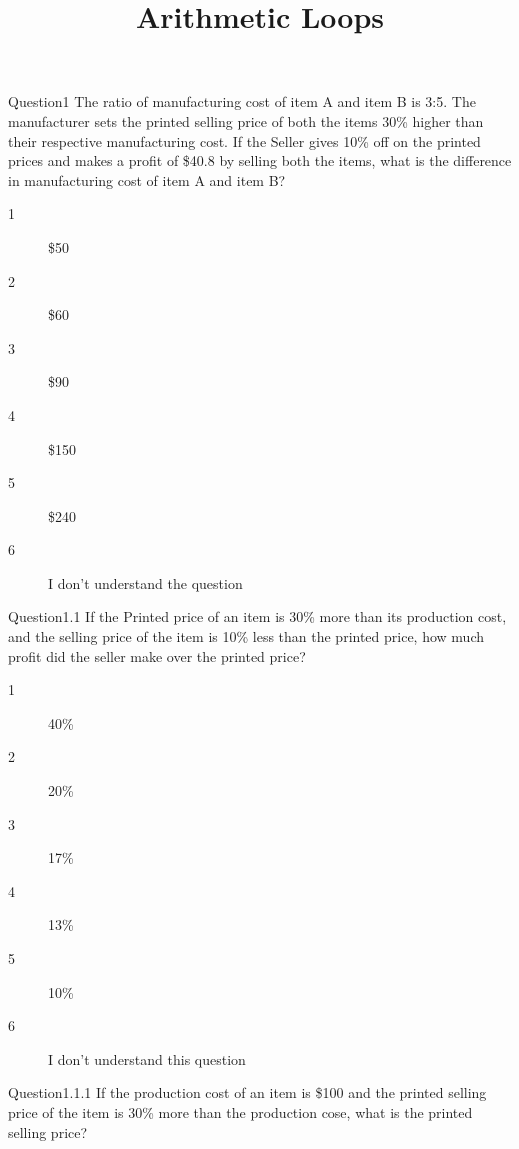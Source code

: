 \documentclass[titlepage]{article}
\title{Arithmetic Loops}
\begin{document}
\begin{section}{Question1}
The ratio of manufacturing cost of item A and item B is 3:5. The manufacturer sets the printed selling price of both the items 30\% higher than their respective manufacturing cost. If the Seller gives 10\% off on the printed prices and makes a profit of \$40.8 by selling both the items, what is the difference in manufacturing cost of item A and item B?
		\begin{description}
		\item[1]
			\$50
		\item[2]
			\$60
		\item[3]
			\$90
		\item[4]
			\$150
		\item[5]
			\$240
		\item[6]
			I don't understand the question
		\end{description}
\begin{subsection}{Question1.1}
If the Printed price of an item is 30\% more than its production cost, and the selling price of the item is 10\% less than the printed price, how much profit did the seller make over the printed price?
		\begin{description}
		\item[1]
			40\%
		\item[2]
			20\%
		\item[3]
			17\%
		\item[4]
			13\%
		\item[5]
			10\%
		\item[6]
			I don't understand this question		
		\end{description}
\begin{subsubsection}{Question1.1.1}
If the production cost of an item is \$100 and the printed selling price of the item is 30\% more than the production cose, what is the printed selling price?

\end{subsubsection}
\end{subsection}
\end{section}
\end{document}
